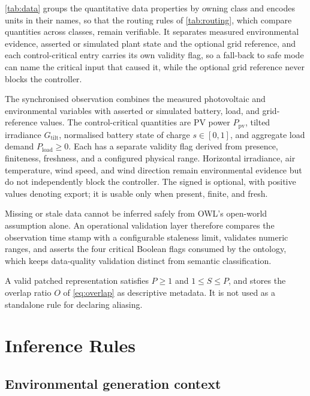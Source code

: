 \autoref{tab:data} groups the quantitative data properties by owning class and encodes units in their names, so that the routing rules of \autoref{tab:routing}, which compare quantities across classes, remain verifiable. It separates measured environmental evidence, asserted or simulated plant state and the optional grid reference, and each control-critical entry carries its own validity flag, so a fall-back to safe mode can name the critical input that caused it, while the optional grid reference never blocks the controller.

The synchronised observation combines the measured photovoltaic and environmental variables with asserted or simulated battery, load, and grid-reference values. The control-critical quantities are PV power $P_{\mathrm{pv}}$, tilted irradiance $G_{\mathrm{tilt}}$, normalised battery state of charge $s\in[0,1]$, and aggregate load demand $P_{\mathrm{load}}\geq0$. Each has a separate validity flag derived from presence, finiteness, freshness, and a configured physical range. Horizontal irradiance, air temperature, wind speed, and wind direction remain environmental evidence but do not independently block the controller. The signed  is optional, with positive values denoting export; it is usable only when present, finite, and fresh.

Missing or stale data cannot be inferred safely from OWL's open-world assumption alone. An operational validation layer therefore compares the observation time stamp with a configurable staleness limit, validates numeric ranges, and asserts the four critical Boolean flags consumed by the ontology, which keeps data-quality validation distinct from semantic classification.



A valid patched representation satisfies $P\geq1$ and $1\leq S\leq P$, and stores the overlap ratio $O$ of \autoref{eq:overlap} as descriptive metadata. It is not used as a standalone rule for declaring aliasing.

\section{Inference Rules}

\subsection{Environmental generation context}

